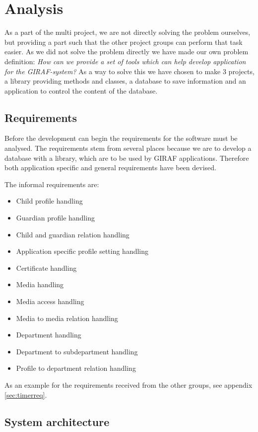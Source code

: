 \chapter{Analysis}
As a part of the multi project, we are not directly solving the problem ourselves, but providing a part such that the other project groups can perform that task easier.
As we did not solve the problem directly we have made our own problem definition:
	\textit{How can we provide a set of tools which can help develop application for the GIRAF-system?}
As a way to solve this we have chosen to make 3 projects, a library providing methods and classes, a database to save information and an application to control the content of the database. 

\section{Requirements}
Before the development can begin the requirements for the software must be analysed.
The requirements stem from several places because we are to develop a database with a library, which are to be used by GIRAF applications.
Therefore both application specific and general requirements have been devised.

The informal requirements are:

\begin{itemize}
	\item Child profile handling
	\item Guardian profile handling
	\item Child and guardian relation handling
	\item Application specific profile setting handling
	\item Certificate handling
	\item Media handling
	\item Media access handling
	\item Media to media relation handling
	\item Department handling
	\item Department to subdepartment handling
	\item Profile to department relation handling
\end{itemize}

As an example for the requirements received from the other groups, see appendix \vref{sec:timerreq}.

\section{System architecture}
